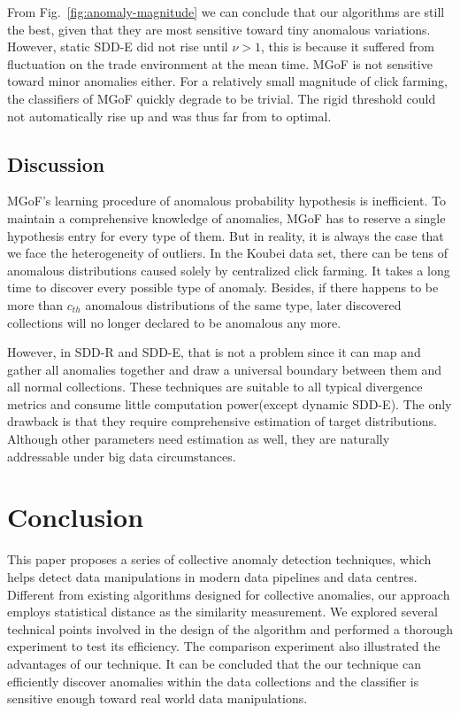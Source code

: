 \documentclass{article}
\begin{document}
			From Fig.~\ref{fig:anomaly-magnitude} we can conclude that our algorithms are still the best, given that they are most sensitive toward tiny anomalous variations. However, static SDD-E did not rise until $\nu > 1$, this is because it suffered from fluctuation on the trade environment at the mean time. MGoF is not sensitive toward minor anomalies either.
			For a relatively small magnitude of click farming, the classifiers of MGoF quickly degrade to be trivial. The rigid threshold could not automatically rise up and was thus far from to optimal. 
	
		\subsection{Discussion}
			MGoF's learning procedure of anomalous probability hypothesis is inefficient. To maintain a comprehensive knowledge of anomalies, MGoF has to reserve a single hypothesis entry for every type of them. But in reality, it is always the case that we face the heterogeneity of outliers. In the Koubei data set, there can be tens of anomalous distributions caused solely by centralized click farming. It takes a long time to discover every possible type of anomaly. Besides, if there happens to be more than $c_{th}$ anomalous distributions of the same type, later discovered collections will no longer declared to be anomalous any more.
			
			However, in SDD-R and SDD-E, that is not a problem since it can map and gather all anomalies together and draw a universal boundary between them and all normal collections. These techniques are suitable to all typical divergence metrics and consume little computation power(except dynamic SDD-E). The only drawback is that they require comprehensive estimation of target distributions. Although other parameters need estimation as well, they are naturally addressable under big data circumstances.
	
	\section{Conclusion}\label{sec:conclusion}
		This paper proposes a series of collective anomaly detection techniques, which helps detect data manipulations in modern data pipelines and data centres. Different from existing algorithms designed for collective anomalies, our approach employs statistical distance as the similarity measurement. We explored several technical points involved in the design of the algorithm and performed a thorough experiment to test its efficiency. The comparison experiment also illustrated the advantages of our technique. It can be concluded that the our technique can efficiently discover anomalies within the data collections and the classifier is sensitive enough toward real world data manipulations. 



\end{document}
